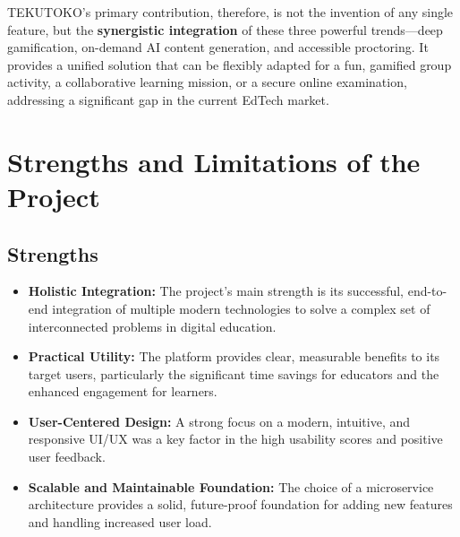 TEKUTOKO's primary contribution, therefore, is not the invention of any single feature, but the \textbf{synergistic integration} of these three powerful trends—deep gamification, on-demand AI content generation, and accessible proctoring. It provides a unified solution that can be flexibly adapted for a fun, gamified group activity, a collaborative learning mission, or a secure online examination, addressing a significant gap in the current EdTech market.

\section{Strengths and Limitations of the Project}
\label{sec:discussion-strengths-limitations}

\subsection{Strengths}
\begin{itemize}
    \item \textbf{Holistic Integration:} The project's main strength is its successful, end-to-end integration of multiple modern technologies to solve a complex set of interconnected problems in digital education.
    \item \textbf{Practical Utility:} The platform provides clear, measurable benefits to its target users, particularly the significant time savings for educators and the enhanced engagement for learners.
    \item \textbf{User-Centered Design:} A strong focus on a modern, intuitive, and responsive UI/UX was a key factor in the high usability scores and positive user feedback.
    \item \textbf{Scalable and Maintainable Foundation:} The choice of a microservice architecture provides a solid, future-proof foundation for adding new features and handling increased user load.
\end{itemize}

